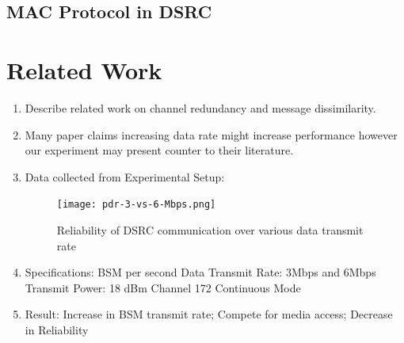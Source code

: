 \documentclass[runningheads,a4paper]{llncs}
\begin{document}
\subsection{MAC Protocol in DSRC}

\section{Related Work}

\begin{enumerate}
	\item Describe related work on channel redundancy and message dissimilarity.
	
	\item Many paper claims increasing data rate might increase performance however our experiment may present counter to their literature.
	
	\item Data collected from Experimental Setup:
		\begin{figure}[thpb] 
			\centering
			\texttt{[image: pdr-3-vs-6-Mbps.png]}
			\caption{Reliability of DSRC communication over various data transmit rate}
			\label{Fig-Pdr}
		\end{figure}
	\item Specifications:
		 BSM per second
		\subitem Data Transmit Rate: 3Mbps and 6Mbps
		\subitem Transmit Power: 18 dBm
		\subitem Channel 172
		\subitem Continuous Mode
	
	\item Result:
		\subitem Increase in BSM transmit rate; Compete for media access; Decrease in Reliability
\end{enumerate}





\end{document}
